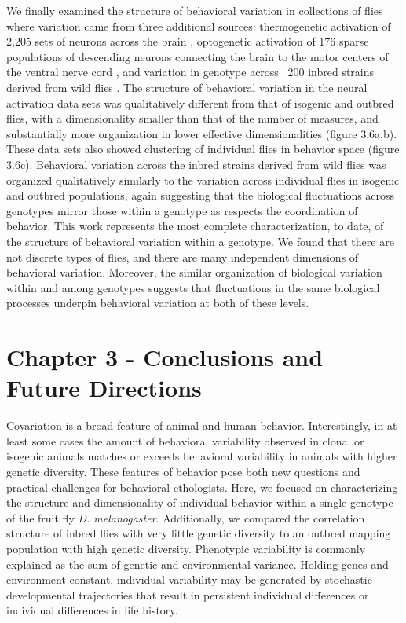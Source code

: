 \documentclass[12pt,letterpaper]{article}
\begin{document}
We finally examined the structure of behavioral variation in collections of flies where variation came from three additional sources: thermogenetic activation of 2,205 sets of neurons across the brain \cite{Robie_Mapping_2017}, optogenetic activation of 176 sparse populations of descending neurons connecting the brain to the motor centers of the ventral nerve cord \cite{Cande_Optogenetic_2018}, and variation in genotype across ~200 inbred strains derived from wild flies \cite{Mackay_The_2012}. The structure of behavioral variation in the neural activation data sets was qualitatively different from that of isogenic and outbred flies, with a dimensionality smaller than that of the number of measures, and substantially more organization in lower effective dimensionalities (figure 3.6a,b). These data sets also showed clustering of individual flies in behavior space (figure 3.6c). Behavioral variation across the inbred strains derived from wild flies was organized qualitatively similarly to the variation across individual flies in isogenic and outbred populations, again suggesting that the biological fluctuations across genotypes mirror those within a genotype as respects the coordination of behavior. This work represents the most complete characterization, to date, of the structure of behavioral variation within a genotype. We found that there are not discrete types of flies, and there are many independent dimensions of behavioral variation. Moreover, the similar organization of biological variation within and among genotypes suggests that fluctuations in the same biological processes underpin behavioral variation at both of these levels.


\section{Chapter 3 - Conclusions and Future Directions}

Covariation is a broad feature of animal and human behavior. Interestingly, in at least some cases the amount of behavioral variability observed in clonal or isogenic animals matches or exceeds behavioral variability in animals with higher genetic diversity. These features of behavior pose both new questions and practical challenges for behavioral ethologists. Here, we focused on characterizing the structure and dimensionality of individual behavior within a single genotype of the fruit fly \textit{D. melanogaster}. Additionally, we compared the correlation structure of inbred flies with very little genetic diversity to an outbred mapping population with high genetic diversity. Phenotypic variability is commonly explained as the sum of genetic and environmental variance. Holding genes and environment constant, individual variability may be generated by stochastic developmental trajectories that result in persistent individual differences or individual differences in life history.
\end{document}
